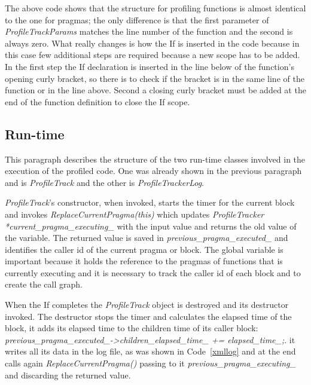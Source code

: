 \documentclass[a4paper,11pt,oneside]{book}
\begin{document}
The above code shows that the structure for profiling functions is almost identical to the one for pragmas; the only difference is that the first parameter of \emph{ProfileTrackParams} matches the line number of the function and the second is always zero. What really changes is how the If is inserted in the code because in this case few additional steps are required because a new scope has to be added. In the first step the If declaration is inserted in the line below of the function’s opening curly bracket, so there is to check if the bracket is in the same line of the function or in the line above. Second a closing curly bracket must be added at the end of the function definition to close the If scope.

\subsection{Run-time}

This paragraph describes the structure of the two run-time classes involved in the execution of the profiled code. One was already shown in the previous paragraph and is \emph{ProfileTrack} and the other is \emph{ProfileTrackerLog}. 

\emph{ProfileTrack}’s constructor, when invoked, starts the timer for the current block and invokes \emph{ReplaceCurrentPragma(this)} which updates \emph{ProfileTracker *current\_pragma\_executing\_} with the input value and returns the old value of the variable. The returned value is saved in \emph{previous\_pragma\_executed\_} and identifies the caller id of the current pragma or block. The global variable is important because it holds the reference to the pragmas of functions that is currently executing and it is necessary to track the caller id of each block and to create the call graph. 

When the If completes the \emph{ProfileTrack} object is destroyed and its destructor invoked. The destructor stops the timer and calculates the elapsed time of the block, it adds its elapsed time to the children time of its caller block:
 \emph{previous\_pragma\_executed\_->children\_elapsed\_time\_ += elapsed\_time\_;}. it writes all its data in the log file, as was shown in Code~\ref{xmllog} and at the end calls again \emph{ReplaceCurrentPragma()} passing to it \emph{previous\_pragma\_executing\_} and discarding the returned value.
\end{document}
